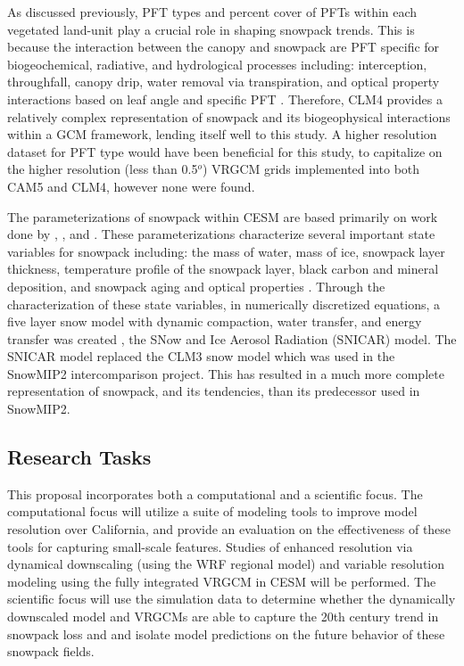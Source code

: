 \documentclass[11pt]{article}
\begin{document}
As discussed previously, PFT types and percent cover of PFTs within each vegetated land-unit play a crucial role in shaping snowpack trends. This is because the interaction between the canopy and snowpack are PFT specific for biogeochemical, radiative, and hydrological processes including: interception, throughfall, canopy drip, water removal via transpiration, and optical property interactions based on leaf angle and specific PFT \citep{lawrence2011parameterization}.  Therefore, CLM4 provides a relatively complex representation of snowpack and its biogeophysical interactions within a GCM framework, lending itself well to this study.   A higher resolution dataset for PFT type would have been beneficial for this study, to capitalize on the higher resolution (less than 0.5$^{o}$) VRGCM grids implemented into both CAM5 and CLM4, however none were found.

The parameterizations of snowpack within CESM are based primarily on work done by \citet{anderson1976point}, \citet{jordan1991one}, and \citet{yongjiu1997land}. These parameterizations characterize several important state variables for snowpack including: the mass of water, mass of ice, snowpack layer thickness, temperature profile of the snowpack layer, black carbon and mineral deposition, and snowpack aging and optical properties \citep{lawrence2011parameterization}. Through the characterization of these state variables, in numerically discretized equations, a five layer snow model with dynamic compaction, water transfer, and energy transfer was created \citep{lawrence2011parameterization}, the SNow and Ice Aerosol Radiation (SNICAR) model.  The SNICAR model replaced the CLM3 snow model which was used in the SnowMIP2 intercomparison project.  This has resulted in a much more complete representation of snowpack, and its tendencies, than its predecessor used in SnowMIP2.

\subsection{Research Tasks}
This proposal incorporates both a computational and a scientific focus. The computational focus will utilize a suite of modeling tools to improve model resolution over California, and provide an evaluation on the effectiveness of these tools for capturing small-scale features. Studies of enhanced resolution via dynamical downscaling (using the WRF regional model) and variable resolution modeling using the fully integrated VRGCM in CESM will be performed. The scientific focus will use the simulation data to determine whether the dynamically downscaled model and VRGCMs are able to capture the 20th century trend in snowpack loss and and isolate model predictions on the future behavior of these snowpack fields.
\end{document}
